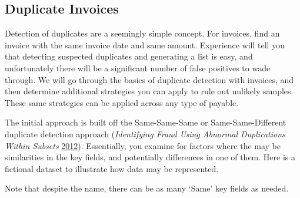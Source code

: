 \documentclass[
]{book}
\begin{document}
\hypertarget{duplicate-invoices}{%
\subsection{Duplicate Invoices}\label{duplicate-invoices}}

Detection of duplicates are a seemingly simple concept. For invoices, find an invoice with the same invoice date and same amount. Experience will tell you that detecting suspected duplicates and generating a list is easy, and unfortunately there will be a significant number of false positives to wade through. We will go through the basics of duplicate detection with invoices, and then determine additional strategies you can apply to rule out unlikely samples. These same strategies can be applied across any type of payable.

The initial approach is built off the Same-Same-Same or Same-Same-Different duplicate detection approach (\emph{Identifying Fraud Using Abnormal Duplications Within Subsets} \protect\hyperlink{ref-nigrini-forensicanalytics-ch12}{2012}). Essentially, you examine for factors where the may be similarities in the key fields, and potentially differences in one of them. Here is a fictional dataset to illustrate how data may be represented.

Note that despite the name, there can be as many `Same' key fields as needed.
\end{document}
